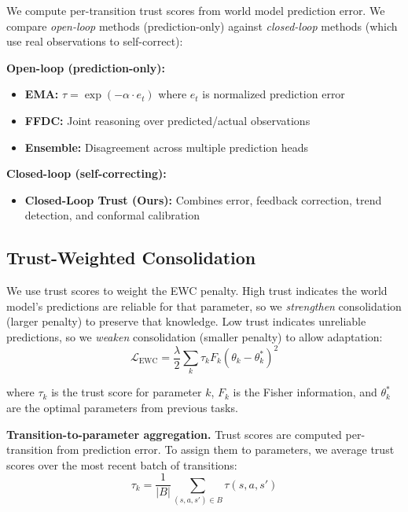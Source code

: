 \documentclass{article}
\begin{document}
We compute per-transition trust scores from world model prediction error. We compare \emph{open-loop} methods (prediction-only) against \emph{closed-loop} methods (which use real observations to self-correct):

\textbf{Open-loop (prediction-only):}
\begin{itemize}
\item \textbf{EMA:} $\tau = \exp(-\alpha \cdot e_t)$ where $e_t$ is normalized prediction error
\item \textbf{FFDC:} Joint reasoning over predicted/actual observations~\cite{when2trust2026}
\item \textbf{Ensemble:} Disagreement across multiple prediction heads~\cite{rwmu2026}
\end{itemize}

\textbf{Closed-loop (self-correcting):}
\begin{itemize}
\item \textbf{Closed-Loop Trust (Ours):} Combines error, feedback correction, trend detection, and conformal calibration
\end{itemize}

\subsection{Trust-Weighted Consolidation}

We use trust scores to weight the EWC penalty. High trust indicates the world model's predictions are reliable for that parameter, so we \emph{strengthen} consolidation (larger penalty) to preserve that knowledge. Low trust indicates unreliable predictions, so we \emph{weaken} consolidation (smaller penalty) to allow adaptation:
\begin{equation}
\mathcal{L}_{\text{EWC}} = \frac{\lambda}{2}\sum_k \tau_k F_k (\theta_k - \theta_k^*)^2
\end{equation}

where $\tau_k$ is the trust score for parameter $k$, $F_k$ is the Fisher information, and $\theta_k^*$ are the optimal parameters from previous tasks.

\textbf{Transition-to-parameter aggregation.} Trust scores are computed per-transition from prediction error. To assign them to parameters, we average trust scores over the most recent batch of transitions:
\begin{equation}
\tau_k = \frac{1}{|B|}\sum_{(s,a,s') \in B} \tau(s, a, s')
\end{equation}
\end{document}

